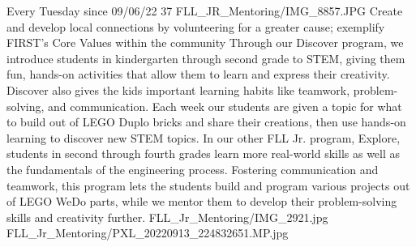{Every Tuesday since 09/06/22}
{37}
{FLL_JR_Mentoring/IMG_8857.JPG}
{Create and develop local connections by volunteering for a greater cause; exemplify FIRST's Core Values within the community} 
{Through our Discover program, we introduce students in kindergarten through second grade to STEM, giving them fun, hands-on activities that allow them to learn and express their creativity. Discover also gives the kids important learning habits like teamwork, problem-solving, and communication. Each week our students are given a topic for what to build out of LEGO Duplo bricks and share their creations, then use hands-on learning to discover new STEM topics. In our other FLL Jr. program, Explore, students in second through fourth grades learn more real-world skills as well as the fundamentals of the engineering process. Fostering communication and teamwork, this program lets the students build and program various projects out of LEGO WeDo parts, while we mentor them to develop their problem-solving skills and creativity further.
} 
{FLL_Jr_Mentoring/IMG_2921.jpg}
{FLL_Jr_Mentoring/PXL_20220913_224832651.MP.jpg}
